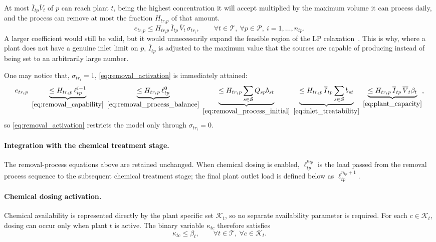 \documentclass[10pt]{article}
\begin{document}
At most $\overline{I}_{tp}\overline{V}_t$ of $p$ can reach plant $t$, being the highest concentration it will accept multiplied by the maximum volume it can process daily, and the process can remove at most the fraction $H_{t r_i p}$ of that amount.
\begin{equation}\label{eq:removal_activation}
    e_{t r_i p} \le H_{t r_i p}\, \overline{I}_{tp}\, \overline{V}_t\, \sigma_{t r_i},
    \qquad \forall t \in \mathcal{T},\ \forall p \in \mathcal{P},\ i = 1, \dots, n_{tp}.
\end{equation}
A larger coefficient would still be valid, but it would unnecessarily expand the feasible region of the LP relaxation~\cite{jstorMP}.
This is why, where a plant does not have a genuine inlet limit on $p$, $\overline{I}_{tp}$ is adjusted to the maximum value that the sources are capable of producing instead of being set to an arbitrarily large number.

One may notice that, $\sigma_{t r_i} = 1$, \eqref{eq:removal_activation} is immediately attained:
\begin{equation*}
    e_{t r_i p}
    ~ \underbrace{\le H_{t r_i p}\,\ell^{i-1}_{tp}}_{\eqref{eq:removal_capability}}
    ~ \underbrace{\le H_{t r_i p}\,\ell^{0}_{tp}}_{\eqref{eq:removal_process_balance}}
    ~ \underbrace{\le H_{t r_i p} \sum_{s \in \mathcal S}
        Q_{sp} b_{st}}_{\eqref{eq:removal_process_initial}} ~ \underbrace{\le H_{t r_i p}\,\overline{I}_{tp} \sum_{s \in \mathcal{S}} b_{st}}_{\eqref{eq:inlet_treatability}} ~ \underbrace{\le H_{t r_i p}\,\overline{I}_{tp}\,\overline{V}_t \beta_t}_{\eqref{eq:plant_capacity}}, \end{equation*} so \eqref{eq:removal_activation} restricts the model only through $\sigma_{t r_i} = 0$.


\paragraph{Integration with the chemical treatment stage.}
The removal-process equations above are retained unchanged.
When chemical dosing is enabled, $\ell^{n_{tp}}_{tp}$ is the load passed from the removal process sequence to the subsequent chemical treatment stage; the final plant outlet load is defined below as $\ell^{n_{tp}+1}_{tp}$.

\paragraph{Chemical dosing activation.}
Chemical availability is represented directly by the plant specific set $\mathcal{K}_t$, so no separate availability parameter is required.
For each $c \in \mathcal{K}_t$, dosing can occur only when plant $t$ is active.
The binary variable $\kappa_{tc}$ therefore satisfies
\begin{equation}\label{eq:chemical_activation}
    \kappa_{tc} \le \beta_t,
    \qquad
    \forall t \in \mathcal{T},\ \forall c \in \mathcal{K}_t.
\end{equation}
\end{document}
